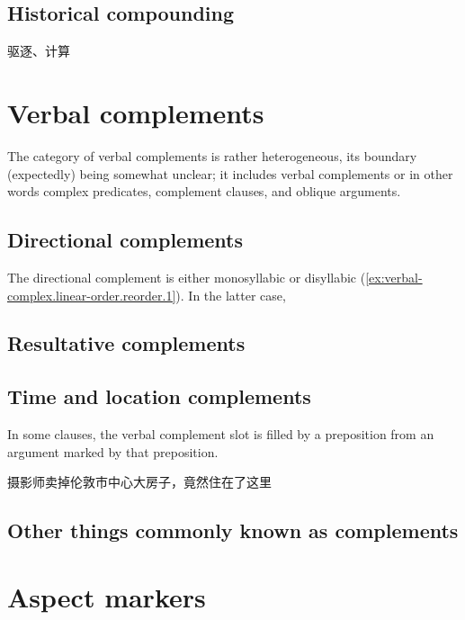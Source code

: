 \documentclass[UTF8, a4paper, oneside, scheme=plain, 12pt]{ctexrep}
\begin{document}
\subsection{Historical compounding}\label{sec:verbal-complex.derivation.compound}

驱逐、计算


\section{Verbal complements}\label{sec:verbal-complex.complement}

The category of verbal complements is rather heterogeneous,
its boundary (expectedly) being somewhat unclear;
it includes verbal complements or in other words complex predicates, 
complement clauses, 
and oblique arguments. 

\subsection{Directional complements}\label{sec:verbal-complex.directional}

The directional complement is either monosyllabic or disyllabic
(\ref{ex:verbal-complex.linear-order.reorder.1}).
In the latter case, 

\subsection{Resultative complements}\label{sec:verbal-complex.resultative}

\subsection{Time and location complements}\label{sec:verbal-complex.prepositional}

In some clauses, the verbal complement slot is filled by a preposition
from an argument marked by that preposition.

\begin{exe}
    \ex 摄影师卖掉伦敦市中心大房子，竟然住在了这里
\end{exe}

\subsection{Other things commonly known as complements}

\section{Aspect markers}
\end{document}
